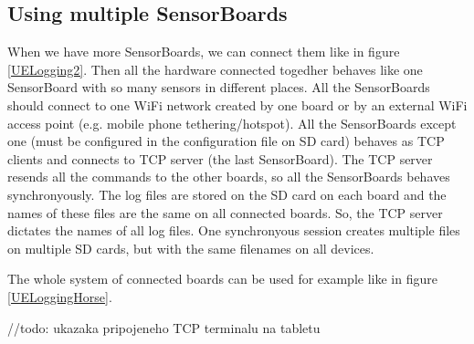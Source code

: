 \subsection{Using multiple SensorBoards}
When we have more SensorBoards, we can connect them like in figure \ref{UELogging2}. Then all the hardware connected togedher behaves like one SensorBoard with so many sensors in different places. All the SensorBoards should connect to one WiFi network created by one board or by an external WiFi access point (e.g. mobile phone tethering/hotspot). All the SensorBoards except one (must be configured in the configuration file on SD card) behaves as TCP clients and connects to TCP server (the last SensorBoard). The TCP server resends all the commands to the other boards, so all the SensorBoards behaves synchronyously. The log files are stored on the SD card on each board and the names of these files are the same on all connected boards. So, the TCP server dictates the names of all log files. One synchronyous session creates multiple files on multiple SD cards, but with the same filenames on all devices.

The whole system of connected boards can be used for example like in figure \ref{UELoggingHorse}.

//todo: ukazaka pripojeneho TCP terminalu na tabletu